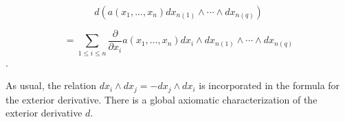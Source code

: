 $$d(a(x_1, \ldots, x_n) dx_{n(1)} \wedge \cdots \wedge dx_{n(q)})$$

$$= \sum_{1 \leq i \leq n} \frac{\partial}{\partial x_i} a(x_1, \ldots, x_n) dx_i \wedge dx_{n(1)} \wedge \cdots \wedge dx_{n(q)}$$.

As usual, the relation $dx_i \wedge dx_j = -dx_j \wedge dx_i$ is incorporated in the formula for the exterior derivative. There is a global axiomatic characterization of the exterior derivative $d$.
